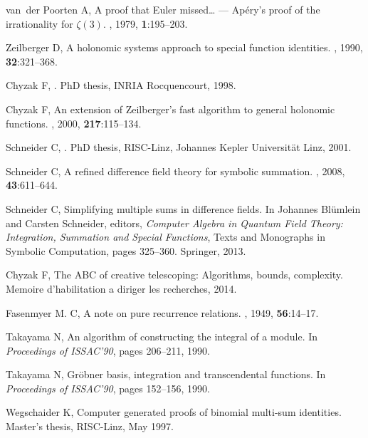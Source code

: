 \documentclass{jssc}
\begin{document}
\begin{thebibliography}{100}
van~der Poorten A,
\newblock A proof that {E}uler missed\dots{} --- {A}p{\'e}ry's proof of the
  irrationality for $\zeta(3)$.
, 1979, {\bf 1}:195--203.

Zeilberger D,
\newblock A holonomic systems approach to special function identities.
, 1990, {\bf 32}:321--368.

Chyzak F,
.
\newblock PhD thesis, INRIA Rocquencourt, 1998.

Chyzak F,
\newblock An extension of {Z}eilberger's fast algorithm to general holonomic
  functions.
, 2000, {\bf 217}:115--134.

Schneider C,
.
\newblock PhD thesis, RISC-Linz, Johannes Kepler Universit{\"a}t Linz, 2001.

Schneider C,
\newblock A refined difference field theory for symbolic summation.
, 2008, {\bf 43}:611--644.

Schneider C,
\newblock Simplifying multiple sums in difference fields.
\newblock In Johannes Bl{\"u}mlein and Carsten Schneider, editors, {\it
  Computer Algebra in Quantum Field Theory: Integration, Summation and Special
  Functions}, Texts and Monographs in Symbolic Computation, pages 325--360.
  Springer, 2013.

Chyzak F,
\newblock The {ABC} of creative telescoping: Algorithms, bounds, complexity.
\newblock Memoire d'habilitation a diriger les recherches, 2014.

Fasenmyer M. C,
\newblock A note on pure recurrence relations.
, 1949, {\bf 56}:14--17.

Takayama N,
\newblock An algorithm of constructing the integral of a module.
\newblock In {\it Proceedings of ISSAC'90}, pages 206--211, 1990.

Takayama N,
\newblock Gr{\"o}bner basis, integration and transcendental functions.
\newblock In {\it Proceedings of ISSAC'90}, pages 152--156, 1990.

Wegschaider K,
\newblock Computer generated proofs of binomial multi-sum identities.
\newblock Master's thesis, RISC-Linz, May 1997.


\end{thebibliography}
\end{document}
